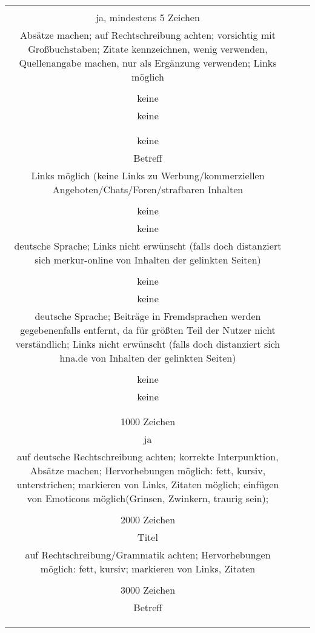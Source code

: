\begin{landscape}
\begin{tabular}{ccc}
{		1500 Zeichen\\
		ja, mindestens 5 Zeichen\\
		Absätze machen; auf Rechtschreibung achten; vorsichtig mit Großbuchstaben; Zitate kennzeichnen, wenig verwenden, Quellenangabe machen, nur als Ergänzung verwenden; Links möglich \\
		&
		\\
		keine\\
		keine\\
		\\
		&%
		\\
		keine\\
		Betreff\\
		Links möglich (keine Links zu Werbung/kommerziellen Angeboten/Chats/Foren/strafbaren Inhalten\\
		&%
		\\
		keine\\
		keine\\
		deutsche Sprache; Links nicht erwünscht (falls doch distanziert sich merkur-online von Inhalten der gelinkten Seiten)\\
		&
		\\
		keine\\
		keine\\
		deutsche Sprache; Beiträge in Fremdsprachen werden gegebenenfalls entfernt, da für größten Teil der Nutzer nicht verständlich; Links nicht erwünscht (falls doch distanziert sich hna.de von Inhalten der gelinkten Seiten)\\
		&
		\\
		keine\\
		keine\\
		\\
		&
		\\
		1000 Zeichen\\
		ja\\
		auf deutsche Rechtschreibung achten; korrekte Interpunktion, Absätze machen; Hervorhebungen möglich: fett, kursiv, unterstrichen; markieren von Links, Zitaten möglich; einfügen von Emoticons möglich(Grinsen, Zwinkern, traurig sein); \\
		&%
		\\
		2000 Zeichen\\
		Titel\\
		auf Rechtschreibung/Grammatik achten; Hervorhebungen möglich: fett, kursiv; markieren von Links, Zitaten\\
		&
		\\
		3000 Zeichen\\
		Betreff\\
		\\
		&
		\\ \hline
		
}
\end{tabular}
\end{landscape}
